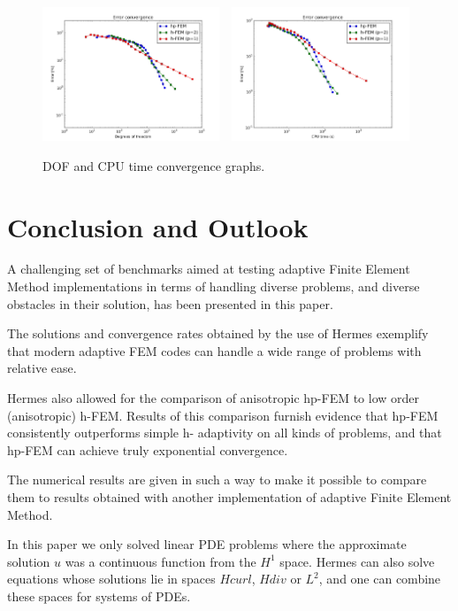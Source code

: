 \documentclass[12pt]{elsarticle}
\begin{document}
\begin{figure}[!ht]
\centering
\includegraphics[height=4cm]{nist/nist-12/conv_dof_aniso.png}\ \
\includegraphics[height=4cm]{nist/nist-12/conv_cpu_aniso.png}
\caption{DOF and CPU time convergence graphs.}
\label{fig:nist-12-conv}
\end{figure}



\section{Conclusion and Outlook}
\label{sec:conclusion}

A challenging set of benchmarks aimed at testing adaptive Finite Element Method implementations in terms of handling diverse problems, and diverse obstacles in their solution, has been presented in this paper.

The solutions and convergence rates obtained by the use of Hermes exemplify that modern adaptive FEM codes can handle a wide range of problems with relative ease.

Hermes also allowed for the comparison of anisotropic hp-FEM to low order (anisotropic) h-FEM. Results of this comparison furnish evidence that hp-FEM consistently outperforms simple h- adaptivity on all kinds of problems, and that hp-FEM can achieve truly exponential convergence.

The numerical results are given in such a way to make it possible to compare them to results obtained with another implementation of adaptive Finite Element Method.

In this paper we only solved linear PDE problems where the approximate solution $u$ was a continuous function from the $H^1$ space.
Hermes can also solve equations whose solutions lie in spaces
$Hcurl$, $Hdiv$ or $L^2$, and one can combine these spaces for systems of PDEs.
\end{document}
